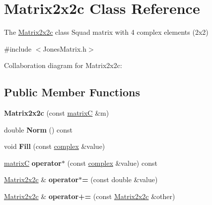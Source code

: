 \hypertarget{class_matrix2x2c}{}\section{Matrix2x2c Class Reference}
\label{class_matrix2x2c}


The \mbox{\hyperlink{class_matrix2x2c}{Matrix2x2c}} class Squad matrix with 4 complex elements (2x2)  




{\ttfamily \#include $<$Jones\+Matrix.\+h$>$}



Collaboration diagram for Matrix2x2c\+:
\subsection*{Public Member Functions}
\begin{DoxyCompactItemize}
\item 
\mbox{\label{class_matrix2x2c_a45a07c0462511e7ff00dab1a0246954d}} 
{\bfseries Matrix2x2c} (const \mbox{\hyperlink{classmatrix_c}{matrixC}} \&m)
\item 
\mbox{\label{class_matrix2x2c_a08a3e514022273afbb9602d97859d5e1}} 
double {\bfseries Norm} () const
\item 
\mbox{\label{class_matrix2x2c_a695ab24fce73ea8731478bff19350de2}} 
void {\bfseries Fill} (const \mbox{\hyperlink{classcomplex}{complex}} \&value)
\item 
\mbox{\label{class_matrix2x2c_a980963d20e47533c17ffcd714d19681c}} 
\mbox{\hyperlink{classmatrix_c}{matrixC}} {\bfseries operator$\ast$} (const \mbox{\hyperlink{classcomplex}{complex}} \&value) const
\item 
\mbox{\label{class_matrix2x2c_a72183df24e5d34ff97e91fa879cdbd1b}} 
\mbox{\hyperlink{class_matrix2x2c}{Matrix2x2c}} \& {\bfseries operator$\ast$=} (const double \&value)
\item 
\mbox{\label{class_matrix2x2c_a70b6828f6137a2a1ac6dd07a074f717e}} 
\mbox{\hyperlink{class_matrix2x2c}{Matrix2x2c}} \& {\bfseries operator+=} (const \mbox{\hyperlink{class_matrix2x2c}{Matrix2x2c}} \&other)
\end{DoxyCompactItemize}
